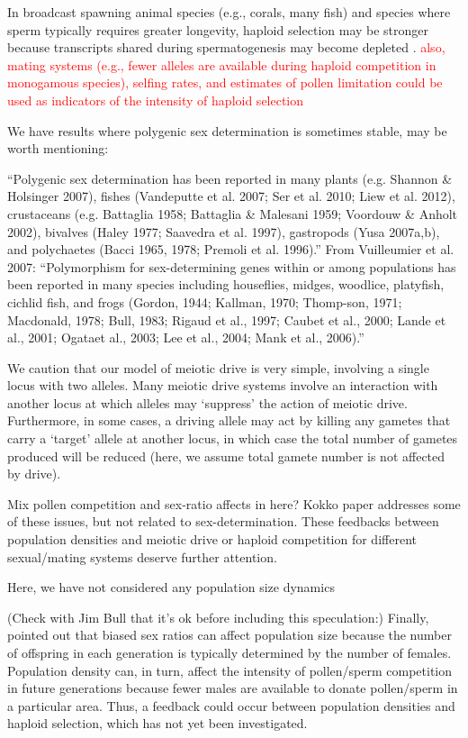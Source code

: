 \documentclass[12pt]{article}
\begin{document}
In broadcast spawning animal species (e.g., corals, many fish) and species where sperm typically requires greater longevity, haploid selection may be stronger because transcripts shared during spermatogenesis may become depleted \citep{Immler:2014im}. 
\textcolor{red}{also, mating systems (e.g., fewer alleles are available during haploid competition in monogamous species), selfing rates, and estimates of pollen limitation could be used as indicators of the intensity of haploid selection}

\noindent
We have results where polygenic sex determination is sometimes stable, may be worth mentioning:

``Polygenic sex determination has been reported in many plants (e.g. Shannon \& Holsinger 2007), fishes (Vandeputte et al. 2007; Ser et al. 2010; Liew et al. 2012), crustaceans (e.g. Battaglia 1958; Battaglia \& Malesani 1959; Voordouw
\& Anholt 2002), bivalves (Haley 1977; Saavedra et al. 1997), gastropods (Yusa 2007a,b), and polychaetes (Bacci 1965, 1978; Premoli et al. 1996).''
From Vuilleumier et al. 2007:
``Polymorphism for sex-determining genes within or among populations has been reported in many species including houseflies, midges, woodlice, platyfish, cichlid fish, and frogs (Gordon, 1944; Kallman, 1970; Thomp-son, 1971; Macdonald, 1978; Bull, 1983; Rigaud et al., 1997; Caubet et al., 2000; Lande et al., 2001; Ogataet al., 2003; Lee et al., 2004; Mank et al., 2006).''

We caution that our model of meiotic drive is very simple, involving a single locus with two alleles. 
Many meiotic drive systems involve an interaction with another locus at which alleles may `suppress' the action of meiotic drive. 
Furthermore, in some cases, a driving allele may act by killing any gametes that carry a `target' allele at another locus, in which case the total number of gametes produced will be reduced (here, we assume total gamete number is not affected by drive). 

Mix pollen competition and sex-ratio affects in here?
Kokko paper addresses some of these issues, but not related to sex-determination. 
These feedbacks between population densities and meiotic drive or haploid competition for different sexual/mating systems deserve further attention. 

Here, we have not considered any population size dynamics 

{\color{blue}
(Check with Jim Bull that it's ok before including this speculation:)
Finally, \citet{Hamilton:1967ts} pointed out that biased sex ratios can affect population size because the number of offspring in each generation is typically determined by the number of females. 
Population density can, in turn, affect the intensity of pollen/sperm competition in future generations because fewer males are available to donate pollen/sperm in a particular area. 
Thus, a feedback could occur between population densities and haploid selection, which has not yet been investigated. 
}
\end{document}
